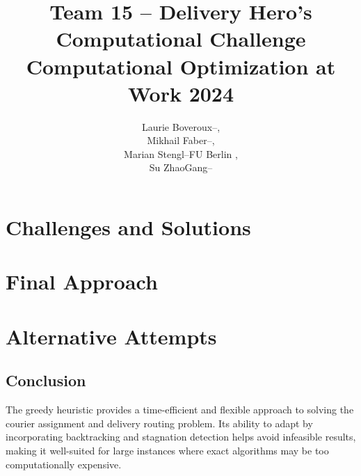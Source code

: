 \documentclass[a4paper]{article}
\title{Team 15 -- Delivery Hero's Computational Challenge \\[0.75em] \Large Computational Optimization at Work 2024}
\author{\normalsize\begin{tabular}{lll}
        Laurie Boveroux & -- &  ,\tabularnewline%
        Mikhail Faber   & -- &  ,\tabularnewline%
        Marian Stengl   & -- & FU Berlin ,\tabularnewline
        Su ZhaoGang     & -- &  \tabularnewline%
\end{tabular}}
\newcommand\path{.}
\begin{document}
%
\maketitle%

\section{Challenges and Solutions}%
%
\section{Final Approach}%
%
\section{Alternative Attempts}%
%
\subsection{Conclusion}
The greedy heuristic provides a time-efficient and flexible approach to solving the courier assignment and delivery routing problem. Its ability to adapt by incorporating backtracking and stagnation detection helps avoid infeasible results, making it well-suited for large instances where exact algorithms may be too computationally expensive.
\end{document}
